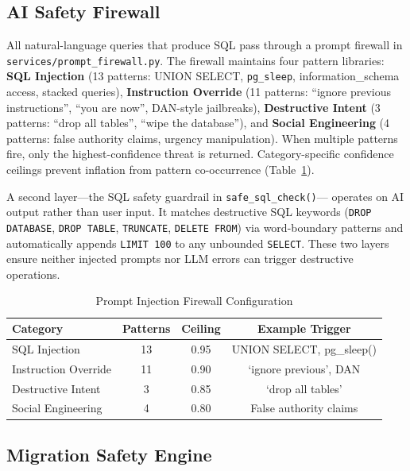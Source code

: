 \documentclass[conference]{IEEEtran}
\begin{document}
\subsection{AI Safety Firewall}

All natural-language queries that produce SQL pass through a prompt
firewall in \texttt{services/prompt\_firewall.py}. The firewall maintains
four pattern libraries: \textbf{SQL Injection} (13 patterns: UNION SELECT,
\texttt{pg\_sleep}, information\_schema access, stacked queries),
\textbf{Instruction Override} (11 patterns: ``ignore previous
instructions'', ``you are now'', DAN-style jailbreaks),
\textbf{Destructive Intent} (3 patterns: ``drop all tables'', ``wipe
the database''), and \textbf{Social Engineering} (4 patterns: false
authority claims, urgency manipulation). When multiple patterns fire,
only the highest-confidence threat is returned. Category-specific
confidence ceilings prevent inflation from pattern co-occurrence
(Table~\ref{tab:firewall}).

A second layer---the SQL safety guardrail in \texttt{safe\_sql\_check()}---
operates on AI output rather than user input. It matches destructive
SQL keywords (\texttt{DROP DATABASE}, \texttt{DROP TABLE},
\texttt{TRUNCATE}, \texttt{DELETE FROM}) via word-boundary patterns
and automatically appends \texttt{LIMIT 100} to any unbounded
\texttt{SELECT}. These two layers ensure neither injected prompts nor LLM
errors can trigger destructive operations.

\begin{table}[htbp]
\caption{Prompt Injection Firewall Configuration}
\label{tab:firewall}
\begin{tabular}{lccc}
\toprule
\textbf{Category} & \textbf{Patterns} & \textbf{Ceiling} & \textbf{Example Trigger} \\
\midrule
SQL Injection & 13 & 0.95 & UNION SELECT, pg\_sleep() \\
Instruction Override & 11 & 0.90 & `ignore previous', DAN \\
Destructive Intent & 3 & 0.85 & `drop all tables' \\
Social Engineering & 4 & 0.80 & False authority claims \\
\bottomrule
\end{tabular}
\end{table}

\subsection{Migration Safety Engine}
\end{document}
